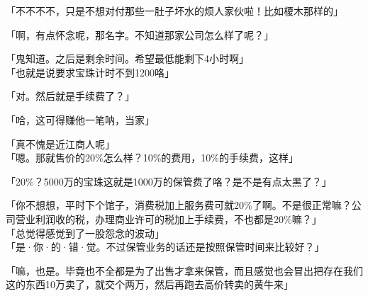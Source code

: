 「不不不不，只是不想对付那些一肚子坏水的烦人家伙啦！比如榎木那样的」

「啊，有点怀念呢，那名字。不知道那家公司怎么样了呢？」

「鬼知道。之后是剩余时间。希望最低能剩下4小时啊」\\

「也就是说要求宝珠计时不到1200咯」

「对。然后就是手续费了？」

「哈，这可得赚他一笔呐，当家」

「真不愧是近江商人呢」\\

「嗯。那就售价的20\%怎么样？10\%的费用，10\%的手续费，这样」

「20\%？5000万的宝珠这就是1000万的保管费了咯？是不是有点太黑了？」

「你不想想，平时下个馆子，消费税加上服务费可就20\%了啊。不是很正常嘛？公司营业利润收的税，办理商业许可的税加上手续费，不也都是20\%嘛？」\\

「总觉得感觉到了一股怨念的波动」\\

「是·你·的·错·觉。不过保管业务的话还是按照保管时间来比较好？」

「嘛，也是。毕竟也不全都是为了出售才拿来保管，而且感觉也会冒出把存在我们这的东西10万卖了，就交个两万，然后再跑去高价转卖的黄牛来」

